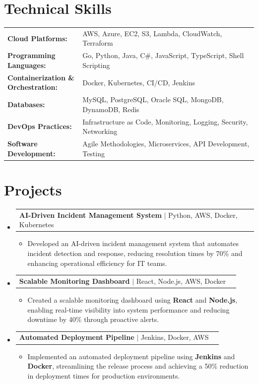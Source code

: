 \documentclass[letterpaper,10pt]{article}
\makeatletter
\newcommand{\resumeItem}[1]{
  \item{\fontsize{8pt}{9pt}\selectfont
    #1 \vspace{-3pt}
  }
}
\newcommand{\resumeProjectHeading}[2]{
    \item
    \begin{tabular*}{1.001\textwidth}{l@{\extracolsep{\fill}}r}
      \fontsize{8.5pt}{10pt}#1 & \textbf{\fontsize{8.5pt}{10pt} #2}\\
    \end{tabular*}\vspace{-7pt}
}
\newcommand{\resumeSubHeadingListStart}{\begin{itemize}[leftmargin=0pt, label={}]}
\newcommand{\resumeSubHeadingListEnd}{\end{itemize}}
\newcommand{\resumeItemListStart}{\begin{itemize}[leftmargin=*]}
\newcommand{\resumeItemListEnd}{\end{itemize}\vspace{-5pt}}
\makeatother
\begin{document}
\section{Technical Skills}
        \vspace{-14pt}
        \begin{table}[h]
            \fontsize{8pt}{9pt}\selectfont
            \begin{tabular}{p{0.3\linewidth} p{0.7\linewidth}}
                \textbf{Cloud Platforms:} & AWS, Azure, EC2, S3, Lambda, CloudWatch, Terraform \\
                \textbf{Programming Languages:} & Go, Python, Java, C\#, JavaScript, TypeScript, Shell Scripting \\
                \textbf{Containerization \& Orchestration:} & Docker, Kubernetes, CI/CD, Jenkins \\
                \textbf{Databases:} & MySQL, PostgreSQL, Oracle SQL, MongoDB, DynamoDB, Redis \\
                \textbf{DevOps Practices:} & Infrastructure as Code, Monitoring, Logging, Security, Networking \\
                \textbf{Software Development:} & Agile Methodologies, Microservices, API Development, Testing \\
            \end{tabular}
        \end{table}
 \vspace{-18pt}

\section{Projects}
    \vspace{-5pt}
    \resumeSubHeadingListStart
          \resumeProjectHeading
            {\textbf{AI-Driven Incident Management System} $|$ Python, AWS, Docker, Kubernetes}{}
            \resumeItemListStart
                \resumeItem{Developed an AI-driven incident management system that automates incident detection and response, reducing resolution times by 70\% and enhancing operational efficiency for IT teams.}
            \resumeItemListEnd
        \vspace{-12pt}
    
        \resumeProjectHeading
            {\textbf{Scalable Monitoring Dashboard} $|$ React, Node.js, AWS, Docker}{}
        \resumeItemListStart
                \resumeItem{Created a scalable monitoring dashboard using \textbf{React} and \textbf{Node.js}, enabling real-time visibility into system performance and reducing downtime by 40\% through proactive alerts.}
        \resumeItemListEnd
      \vspace{-12pt}
      \resumeProjectHeading
        {\textbf{Automated Deployment Pipeline} $|$ Jenkins, Docker, AWS}{}
    \resumeItemListStart
            \resumeItem{Implemented an automated deployment pipeline using \textbf{Jenkins} and \textbf{Docker}, streamlining the release process and achieving a 50\% reduction in deployment times for production environments.}
    \resumeItemListEnd
    \resumeSubHeadingListEnd
\end{document}

